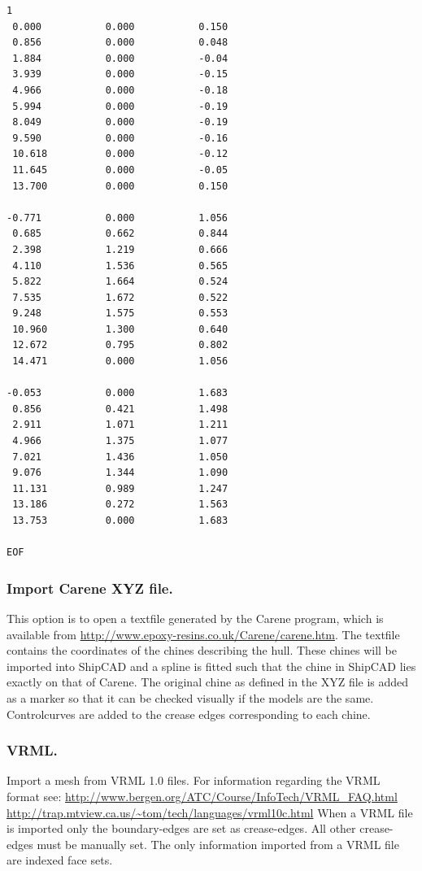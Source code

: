 \documentclass[12pt]{article}
\begin{document}
\begin{verbatim}
1
 0.000           0.000           0.150
 0.856           0.000           0.048
 1.884           0.000           -0.04
 3.939           0.000           -0.15
 4.966           0.000           -0.18
 5.994           0.000           -0.19
 8.049           0.000           -0.19
 9.590           0.000           -0.16
 10.618          0.000           -0.12
 11.645          0.000           -0.05
 13.700          0.000           0.150
 
-0.771           0.000           1.056
 0.685           0.662           0.844
 2.398           1.219           0.666
 4.110           1.536           0.565
 5.822           1.664           0.524
 7.535           1.672           0.522
 9.248           1.575           0.553
 10.960          1.300           0.640
 12.672          0.795           0.802
 14.471          0.000           1.056
 
-0.053           0.000           1.683
 0.856           0.421           1.498
 2.911           1.071           1.211
 4.966           1.375           1.077
 7.021           1.436           1.050
 9.076           1.344           1.090
 11.131          0.989           1.247
 13.186          0.272           1.563
 13.753          0.000           1.683

EOF
\end{verbatim}

\subsubsection{Import Carene XYZ file.}
This option is to open a textfile generated by the Carene program,
which is available from
\url{http://www.epoxy-resins.co.uk/Carene/carene.htm}. The textfile
contains the coordinates of the chines describing the hull. These
chines will be imported into ShipCAD and a spline is fitted such that
the chine in ShipCAD lies exactly on that of Carene. The original
chine as defined in the XYZ file is added as a marker so that it can
be checked visually if the models are the same. Controlcurves are
added to the crease edges corresponding to each chine.

\subsubsection{VRML.}
Import a mesh from VRML 1.0 files. For information regarding the VRML
format see:
\url{http://www.bergen.org/ATC/Course/InfoTech/VRML_FAQ.html}
\url{http://trap.mtview.ca.us/~tom/tech/languages/vrml10c.html}
When a VRML file is imported only the boundary-edges are set as crease-edges. All other crease-
edges must be manually set. The only information imported from a VRML file are indexed face sets.
\end{document}
